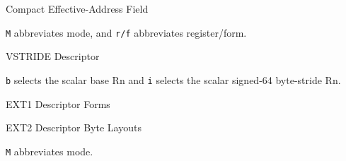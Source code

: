 \begin{manuallistedformatdiagram}{Compact Effective-Address Field}
\end{manuallistedformatdiagram}
{\small\texttt{M} abbreviates mode, and \texttt{r/f} abbreviates register/form.\par}

\begin{manuallistedformatdiagram}{VSTRIDE Descriptor}
\end{manuallistedformatdiagram}
{\small\texttt{b} selects the scalar base Rn and \texttt{i} selects the scalar signed-64 byte-stride Rn.\par}

\begin{manuallistedformatdiagram}{EXT1 Descriptor Forms}
\end{manuallistedformatdiagram}

\begin{manuallistedformatdiagram}{EXT2 Descriptor Byte Layouts}
\end{manuallistedformatdiagram}
{\small\texttt{M} abbreviates mode.\par}
